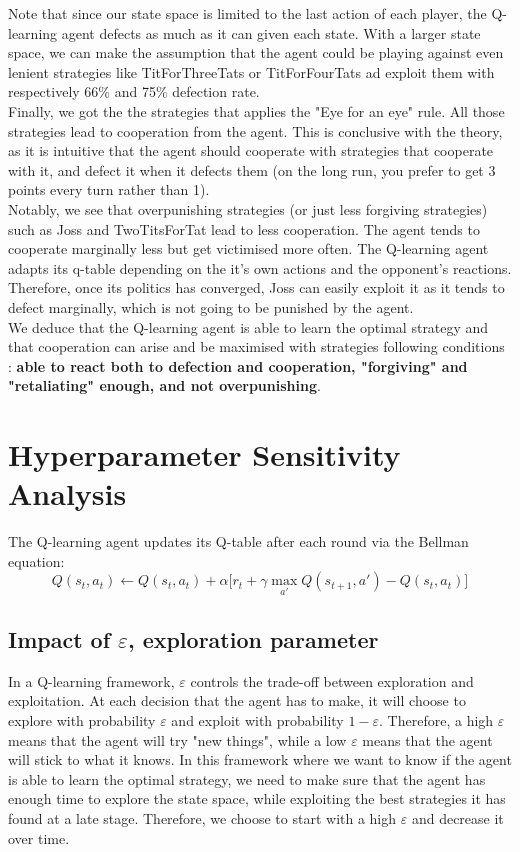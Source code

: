 \documentclass[11pt, a4paper]{article}
\begin{document}
Note that since our state space is limited to the last action of each player, the Q-learning agent defects as much as it can given each state. With a larger state space, we can make the assumption that the agent could be playing against even lenient strategies like TitForThreeTats or TitForFourTats ad exploit them with respectively 66\% and 75\% defection rate. \\

Finally, we got the the strategies that applies the "Eye for an eye" rule. All those strategies lead to cooperation from the agent. This is conclusive with the theory, as it is intuitive that the agent should cooperate with strategies that cooperate with it, and defect it when it defects them (on the long run, you prefer to get 3 points every turn rather than 1).\\

Notably, we see that overpunishing strategies (or just less forgiving strategies) such as Joss and TwoTitsForTat lead to less cooperation. The agent tends to cooperate marginally less but get victimised more often. The Q-learning agent adapts its q-table depending on the it's own actions and the opponent's reactions. Therefore, once its politics has converged, Joss can easily exploit it as it tends to defect marginally, which is not going to be punished by the agent. \\ 

We deduce that the Q-learning agent is able to learn the optimal strategy and that cooperation can arise and be maximised with strategies following conditions : \textbf{able to react both to defection and cooperation, "forgiving" and "retaliating" enough, and not overpunishing}. \\

\section{Hyperparameter Sensitivity Analysis}
\label{sec:hyperparams}

The Q-learning agent updates its Q-table after each round via the Bellman equation:
\[
Q(s_t, a_t) \leftarrow Q(s_t, a_t) + \alpha\bigl[r_t + \gamma \max_{a'} Q(s_{t+1}, a') - Q(s_t, a_t)\bigr]
\]
\subsection{Impact of $\varepsilon$, exploration parameter}

In a Q-learning framework, $\varepsilon$ controls the trade-off between exploration and exploitation.
At each decision that the agent has to make, it will choose to explore with probability $\varepsilon$ and exploit with probability $1-\varepsilon$.
Therefore, a high $\varepsilon$ means that the agent will try "new things", while a low $\varepsilon$ means that the agent will stick to what it knows.
In this framework where we want to know if the agent is able to learn the optimal strategy, we need to make sure that the agent has enough time to explore the state space, while exploiting the best strategies it has found at a late stage. 
Therefore, we choose to start with a high $\varepsilon$ and decrease it over time. \\
\end{document}
